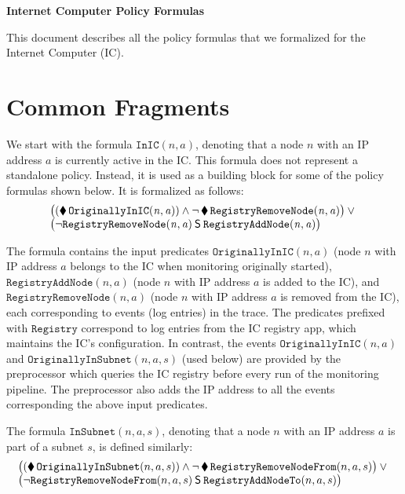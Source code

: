 \documentclass[a4paper,headings=normal]{scrartcl}
\newcommand*{\Since}{\mathbin{\mathsf{S}}}
\newcommand*{\Once}{\operatorname{\blacklozenge}}
\newcommand*{\Pred}[1]{\mathtt{#1}}
\newcommand*{\OrigInIC}{\Pred{OriginallyInIC}}
\newcommand*{\OrigInSubnet}{\Pred{OriginallyInSubnet}}
\newcommand*{\NodeAdded}{\Pred{RegistryAddNode}}
\newcommand*{\NodeRemoved}{\Pred{RegistryRemoveNode}}
\newcommand*{\NodeAddedSubnet}{\Pred{RegistryAddNodeTo}}
\newcommand*{\NodeRemovedSubnet}{\Pred{RegistryRemoveNodeFrom}}
\newcommand*{\InIC}{\Pred{InIC}}
\newcommand*{\InSubnet}{\Pred{InSubnet}}
\begin{document}
\begin{center}
\sffamily\bfseries\LARGE
Internet Computer Policy Formulas
\end{center}

\bigskip\noindent
This document describes all the policy formulas that we formalized for the Internet Computer (IC).

\section{Common Fragments}

We start with the formula $\InIC(n,a)$, denoting that a node $n$ with an
IP address $a$ is currently active in the IC.
This formula does not represent a standalone policy.
Instead, it is used as a building block for some of the policy formulas shown below.
It is formalized as follows:
\begin{align*}
    \begin{array}[t]{l}
    \bigl((\Once \OrigInIC(\mathit{n},\mathit{a})) \land \lnot \Once \NodeRemoved(\mathit{n},\mathit{a}) \bigr) \lor{} \\
    \bigl(\lnot \NodeRemoved(\mathit{n},\mathit{a}) \Since \NodeAdded(\mathit{n},\mathit{a})\bigr)
    \end{array}
\end{align*}

The formula contains the input predicates
$\OrigInIC(\mathit{n},\mathit{a})$ (node $n$ with IP address $a$ belongs to the IC when monitoring originally started),
$\NodeAdded(\mathit{n},\mathit{a})$ (node $n$ with IP address $a$ is added to the IC), and
$\NodeRemoved(\mathit{n},\mathit{a})$ (node $n$ with IP address $a$ is removed from the IC),
each corresponding to events (log entries) in the trace.
The predicates prefixed with $\Pred{Registry}$ correspond to log entries from the IC registry app, which maintains the IC's configuration.
In contrast, the events $\OrigInIC(\mathit{n},\mathit{a})$ and $\OrigInSubnet(n,a,s)$ (used below) are provided by the preprocessor
which queries the IC registry before every run of the monitoring pipeline.
The preprocessor also adds the IP address to all the events corresponding the above input predicates.

The formula $\InSubnet(n,a,s)$, denoting that a node $n$ with an
IP address $a$ is part of a subnet $s$, is defined similarly:
\begin{align*}
    \begin{array}[t]{l}
    \bigl((\Once \OrigInSubnet(n,a,s)) \land \lnot \Once \NodeRemovedSubnet(n,a,s) \bigr) \lor{} \\
    \bigl(\lnot \NodeRemovedSubnet(n,a,s) \Since \NodeAddedSubnet(n,a,s)\bigr)
    \end{array}
\end{align*}
\end{document}
